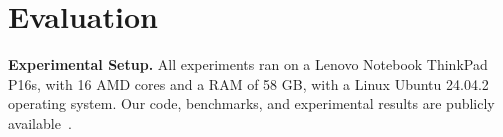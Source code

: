 \section{Evaluation}
\label{sec:evaluation}



\noindent
\textbf{Experimental Setup.}
All experiments ran on a Lenovo Notebook ThinkPad P16s, with 16 AMD cores and a RAM of 58 GB, with a Linux Ubuntu 24.04.2 operating system.
%
%
Our code, benchmarks, and experimental results are publicly available~\cite{ArtifactRepository}.
 



